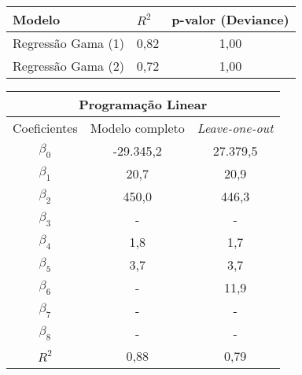 \documentclass{article}
\begin{document}
\begin{table}[]
	\centering
	\begin{tabular}{lcc}
		\hline
		\textbf{Modelo}    & \multicolumn{1}{l}{$R^{2}$} & \textbf{p-valor (Deviance)} \\ \hline
		Regressão Gama (1) & 0,82                        & 1,00              \\
		Regressão Gama (2) & 0,72                        & 1,00              \\ \hline
	\end{tabular}
\end{table}

\begin{table}[]
	\centering
	\begin{tabular}{ccc}
		\hline
		\multicolumn{3}{c}{\textbf{Programação Linear}}                             \\ \hline
		\multicolumn{1}{l}{Coeficientes} & Modelo completo & \textit{Leave-one-out} \\ \hline
		$\beta_0$                        & -29.345,2       & 27.379,5               \\
		$\beta_1$                        & 20,7           & 20,9                   \\
		$\beta_2$                        & 450,0           & 446,3                  \\
		$\beta_3$                        & -             & -                   \\
		$\beta_4$                        & 1,8             & 1,7                   \\
		$\beta_5$                        & 3,7             & 3,7                    \\
		$\beta_6$                        & -             & 11,9              \\
		$\beta_7$                        & -             & -                   \\
		$\beta_8$                        & -             & -                   \\ \hline
		$R^{2}$                          & 0,88             & 0,79                    \\ \hline  \hline
	\end{tabular}
\end{table}
\end{document}
